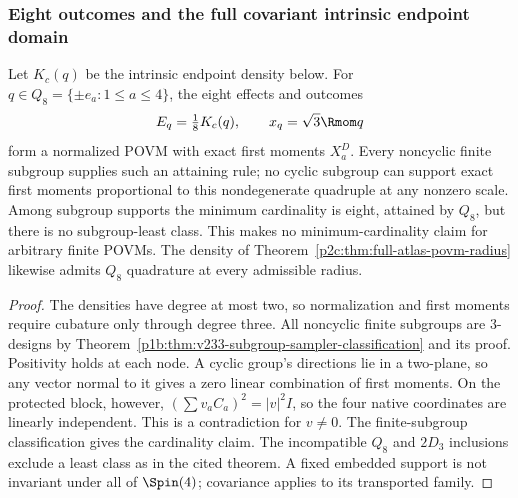 \documentclass[11pt,a4paper]{article}
\begin{document}
\subsubsection{Eight outcomes and the full covariant intrinsic endpoint domain}
\label{p2c:app:v233-eight-outcomes}

\begin{corollary}
\label{p2c:cor:v233-optimal-quaternion-povm}
Let \(K_c(q)\) be the intrinsic endpoint density below.
For \(q\in Q_8=\{\pm e_a:1\le a\le4\}\), the eight effects and outcomes
\[
 E_q=\tfrac18K_c(q),\qquad x_q=\sqrt3\Rmom q
\]
form a normalized POVM with exact first moments \(X_a^D\).
Every noncyclic finite subgroup supplies such an attaining rule;
no cyclic subgroup can support exact first moments proportional
to this nondegenerate quadruple at any nonzero scale.
Among subgroup supports the minimum cardinality is eight, attained
by \(Q_8\), but there is no subgroup-least class.
This makes no minimum-cardinality claim for arbitrary finite POVMs.
The density of Theorem~\ref{p2c:thm:full-atlas-povm-radius}
likewise admits \(Q_8\) quadrature at every admissible radius.
\end{corollary}
\begin{proof}
The densities have degree at most two, so normalization and
first moments require cubature only through degree three.
All noncyclic finite subgroups are 3-designs by
Theorem~\ref{p1b:thm:v233-subgroup-sampler-classification}
and its proof. Positivity holds at each node.
A cyclic group's directions lie in a two-plane, so any vector
normal to it gives a zero linear combination of first moments.
On the protected block, however,
\((\sum v_a C_a)^2=|v|^2I\), so the four native coordinates
are linearly independent. This is a contradiction for \(v\ne0\).
The finite-subgroup classification gives the cardinality claim.
The incompatible \(Q_8\) and \(2D_3\) inclusions exclude a least
class as in the cited theorem. A fixed embedded support is not
invariant under all of \(\Spin(4)\); covariance applies to its
transported family.
\end{proof}
\end{document}
